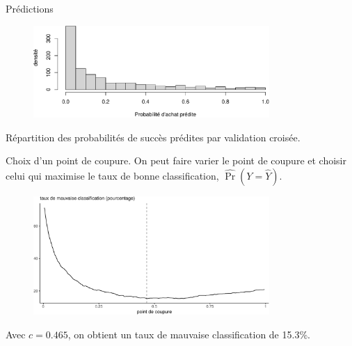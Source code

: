 \documentclass[
  ignorenonframetext,
]{beamer}
\begin{document}
\begin{frame}{Prédictions}
\protect\hypertarget{pruxe9dictions}{}
\begin{figure}

{\centering \includegraphics[width=0.8\textwidth,height=\textheight]{MATH60602-diapos7_files/figure-beamer/figclassification0-1.pdf}

}

\end{figure}

\footnotesize

Répartition des probabilités de succès prédites par validation croisée.

\normalsize
\end{frame}

\begin{frame}{Choix d'un point de coupure.}
\protect\hypertarget{choix-dun-point-de-coupure.}{}
On peut faire varier le point de coupure et choisir celui qui maximise
le taux de bonne classification, \(\widehat{\Pr}(Y = \widehat{Y})\).

\begin{figure}

{\centering \includegraphics[width=0.8\textwidth,height=\textheight]{MATH60602-diapos7_files/figure-beamer/unnamed-chunk-4-1.pdf}

}

\end{figure}

Avec \(c=0.465\), on obtient un taux de mauvaise classification de
15.3\%.
\end{frame}
\end{document}
